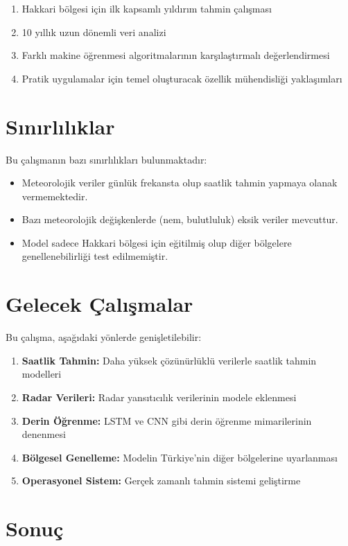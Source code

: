 \begin{enumerate}
    \item Hakkari bölgesi için ilk kapsamlı yıldırım tahmin çalışması
    \item 10 yıllık uzun dönemli veri analizi
    \item Farklı makine öğrenmesi algoritmalarının karşılaştırmalı değerlendirmesi
    \item Pratik uygulamalar için temel oluşturacak özellik mühendisliği yaklaşımları
\end{enumerate}

\section{Sınırlılıklar}

Bu çalışmanın bazı sınırlılıkları bulunmaktadır:

\begin{itemize}
    \item Meteorolojik veriler günlük frekansta olup saatlik tahmin yapmaya olanak vermemektedir.
    \item Bazı meteorolojik değişkenlerde (nem, bulutluluk) eksik veriler mevcuttur.
    \item Model sadece Hakkari bölgesi için eğitilmiş olup diğer bölgelere genellenebilirliği test edilmemiştir.
\end{itemize}

\section{Gelecek Çalışmalar}

Bu çalışma, aşağıdaki yönlerde genişletilebilir:

\begin{enumerate}
    \item \textbf{Saatlik Tahmin:} Daha yüksek çözünürlüklü verilerle saatlik tahmin modelleri
    \item \textbf{Radar Verileri:} Radar yansıtıcılık verilerinin modele eklenmesi
    \item \textbf{Derin Öğrenme:} LSTM ve CNN gibi derin öğrenme mimarilerinin denenmesi
    \item \textbf{Bölgesel Genelleme:} Modelin Türkiye'nin diğer bölgelerine uyarlanması
    \item \textbf{Operasyonel Sistem:} Gerçek zamanlı tahmin sistemi geliştirme
\end{enumerate}

\section{Sonuç}

